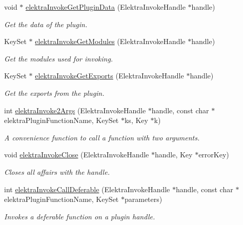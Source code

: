 \begin{DoxyCompactItemize}
void $\ast$ \hyperlink{group__invoke_gac615e211a4d3c77addfa18152c274345}{elektra\+Invoke\+Get\+Plugin\+Data} (Elektra\+Invoke\+Handle $\ast$handle)
\begin{DoxyCompactList}\small\item\em Get the data of the plugin. \end{DoxyCompactList}\item 
Key\+Set $\ast$ \hyperlink{group__invoke_gaf3564011b52e96c9754a7b9bc41ea478}{elektra\+Invoke\+Get\+Modules} (Elektra\+Invoke\+Handle $\ast$handle)
\begin{DoxyCompactList}\small\item\em Get the modules used for invoking. \end{DoxyCompactList}\item 
Key\+Set $\ast$ \hyperlink{group__invoke_ga6ab386aba337d8d3fd7978070d613efe}{elektra\+Invoke\+Get\+Exports} (Elektra\+Invoke\+Handle $\ast$handle)
\begin{DoxyCompactList}\small\item\em Get the exports from the plugin. \end{DoxyCompactList}\item 
int \hyperlink{group__invoke_gaa257d93399c60f73c611205bbfa7c9a0}{elektra\+Invoke2\+Args} (Elektra\+Invoke\+Handle $\ast$handle, const char $\ast$elektra\+Plugin\+Function\+Name, Key\+Set $\ast$ks, Key $\ast$k)
\begin{DoxyCompactList}\small\item\em A convenience function to call a function with two arguments. \end{DoxyCompactList}\item 
void \hyperlink{group__invoke_ga684a21daa0b3c20783c55184a9157b3b}{elektra\+Invoke\+Close} (Elektra\+Invoke\+Handle $\ast$handle, Key $\ast$error\+Key)
\begin{DoxyCompactList}\small\item\em Closes all affairs with the handle. \end{DoxyCompactList}\item 
int \hyperlink{group__invoke_ga0c1fe2bab1f3a465106d6585363787a1}{elektra\+Invoke\+Call\+Deferable} (Elektra\+Invoke\+Handle $\ast$handle, const char $\ast$elektra\+Plugin\+Function\+Name, Key\+Set $\ast$parameters)
\begin{DoxyCompactList}\small\item\em Invokes a deferable function on a plugin handle. \end{DoxyCompactList}\item 

\end{DoxyCompactItemize}
